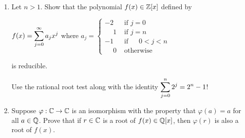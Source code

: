 \documentclass[11pt,fleqn,dvipsnames,usenames]{article}
\begin{document}
\begin{enumerate}[1.]
\item Let $n > 1$.  Show that the polynomial $f(x)\in\mathbb{Z}[x]$ defined by
\begin{center}
$f(x) = \displaystyle\sum\limits_{j=0}^{\infty}a_{j}x^{j}$ where 
$a_{j} = \begin{cases}-2 & \text{ if }j=0\\\phantom{-}1 & \text{ if }j=n\\-1 &\text{ if }\phantom{-}0 < j < n\\\phantom{-}0 & \text{ otherwise}\end{cases}$
\end{center}
is reducible.

\hint Use the rational root test along with the identity $\displaystyle\sum\limits_{j=0}^{n}2^{j} = 2^{n} - 1$!

\item Suppose $\varphi:\mathbb{C}\to\mathbb{C}$ is an isomorphism with the property that $\varphi(a) = a$ for all $a\in \mathbb{Q}$.  Prove that if $r\in\mathbb{C}$ is a root of $f(x)\in \mathbb{Q}[x]$, then $\varphi(r)$ is also a root of $f(x)$.
\end{enumerate}
\newpage
\end{document}
